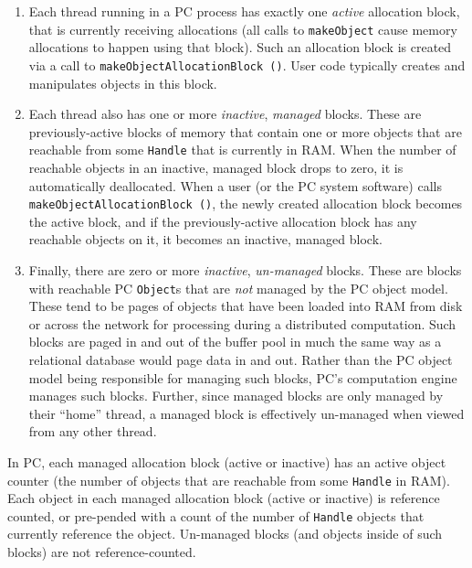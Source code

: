 \begin{enumerate}

\item Each thread running in a PC process has exactly one \emph{active} allocation block, that is currently receiving allocations (all calls to
\texttt{makeObject} cause memory allocations to happen using that block).  Such an allocation block is created via a call to 
\texttt{makeObjectAllocationBlock ()}.  User code typically creates and manipulates objects in this block.

\item Each thread also has one or more
\emph{inactive}, \emph{managed} blocks.  These are previously-active blocks of memory that contain one or more objects that are reachable
from some \texttt{Handle} that is currently in RAM.  When the number of reachable objects in an inactive, managed block drops to zero, it is automatically
deallocated.
When a user (or the PC system software) calls 
\texttt{makeObjectAllocationBlock ()}, the newly created allocation block becomes the active block, and if the previously-active allocation block has any
reachable objects on it, it becomes an inactive, managed block.

\item Finally, there are zero or more \emph{inactive},
  \emph{un-managed} blocks.  These are blocks with reachable PC
  \texttt{Object}s that are \emph{not} managed by the PC object model.  These tend to be pages of objects that have
been loaded into RAM from disk or across the network for processing
during a distributed computation.  Such blocks are paged in and out of the
buffer pool in much the same way as a relational database would page data in and out.
Rather than the PC object model being responsible for managing such blocks, PC's computation engine manages such blocks.
Further, since managed blocks are only managed by their ``home'' thread, a managed block is effectively un-managed when viewed from
any other thread.

\end{enumerate}

In PC, each managed allocation block (active or inactive) has an active object counter (the number of objects that are reachable
from some \texttt{Handle} in RAM).  Each object in each managed allocation block (active or inactive) is reference counted, or pre-pended with a count of
the number of \texttt{Handle} objects that currently reference the object.  
Un-managed blocks (and objects inside of such blocks) are not reference-counted.

